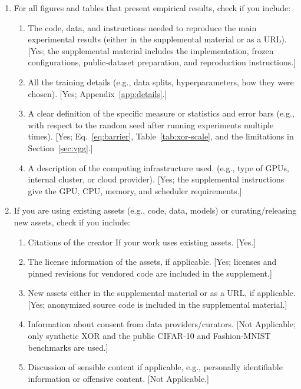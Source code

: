 \documentclass[twoside]{article}
\begin{document}
\begin{enumerate}
  \item For all figures and tables that present empirical results, check if you include:
  \begin{enumerate}
    \item The code, data, and instructions needed to reproduce the main
    experimental results (either in the supplemental material or as a URL).
    [Yes; the supplemental material includes the implementation, frozen
    configurations, public-dataset preparation, and reproduction instructions.]
    \item All the training details (e.g., data splits, hyperparameters, how they
    were chosen). [Yes; Appendix~\ref{app:details}.]
    \item A clear definition of the specific measure or statistics and error
    bars (e.g., with respect to the random seed after running experiments
    multiple times). [Yes; Eq.~\ref{eq:barrier}, Table~\ref{tab:xor-scale}, and
    the limitations in Section~\ref{sec:vgg}.]
    \item A description of the computing infrastructure used. (e.g., type of
    GPUs, internal cluster, or cloud provider). [Yes; the supplemental
    instructions give the GPU, CPU, memory, and scheduler requirements.]
  \end{enumerate}

  \item If you are using existing assets (e.g., code, data, models) or
  curating/releasing new assets, check if you include:
  \begin{enumerate}
    \item Citations of the creator If your work uses existing assets. [Yes.]
    \item The license information of the assets, if applicable. [Yes; licenses
    and pinned revisions for vendored code are included in the supplement.]
    \item New assets either in the supplemental material or as a URL, if
    applicable. [Yes; anonymized source code is included in the supplemental
    material.]
    \item Information about consent from data providers/curators. [Not
    Applicable; only synthetic XOR and the public CIFAR-10 and Fashion-MNIST
    benchmarks are used.]
    \item Discussion of sensible content if applicable, e.g., personally
    identifiable information or offensive content. [Not Applicable.]
  \end{enumerate}


\end{enumerate}
\end{document}
